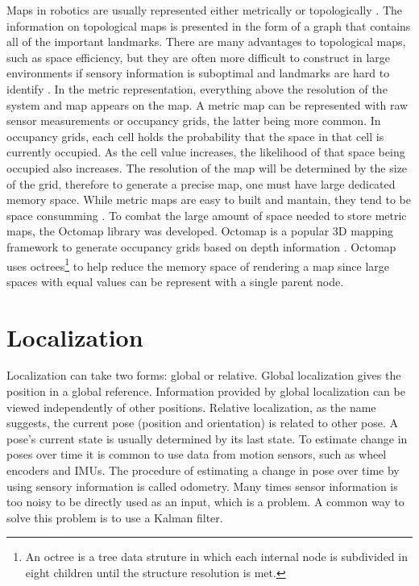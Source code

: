 Maps in robotics are usually represented either metrically or topologically \cite{thrun_learning_1998}. The information on topological maps is presented in the form of a graph that contains all of the important landmarks. There are many advantages to topological maps, such as space efficiency, but they are often more difficult to construct in large environments if sensory information is suboptimal and landmarks are hard to identify \cite{thrun_learning_1998}. In the metric representation, everything above the resolution of the system and map appears on the map. A metric map can be represented with raw sensor measurements or occupancy grids, the latter being more common. In occupancy grids, each cell holds the probability that the space in that cell is currently occupied. As the cell value increases, the likelihood of that space being occupied also increases. The resolution of the map will be determined by the size of the grid, therefore to generate a precise map, one must have large dedicated memory space. While metric maps are easy to built and mantain, they tend to be space consumming \cite{thrun_learning_1998}. To combat the large amount of space needed to store metric maps, the Octomap library was developed. 
Octomap is a popular 3D mapping framework to generate occupancy grids based on depth information \cite{hornung_octomap_2013}. Octomap uses octrees\footnote{An octree is a tree data struture in which each internal node is subdivided in eight children until the structure resolution is met.} to help reduce the memory space of rendering a map since large spaces with equal values can be represent with a single parent node.

\section{Localization}
Localization can take two forms: global or relative. Global localization gives the position in a global reference. Information provided by global localization can be viewed independently of other positions.
Relative localization, as the name suggests, the current pose (position and orientation) is related to other pose. A pose's current state is usually determined by its last state. To estimate change in poses over time it is common to use data from motion sensors, such as wheel encoders and \acs*{IMU}s. The procedure of estimating a change in pose over time by using sensory information is called odometry. 
Many times sensor information is too noisy to be directly used as an input, which is a problem. A common way to solve this problem is to use a Kalman filter.

